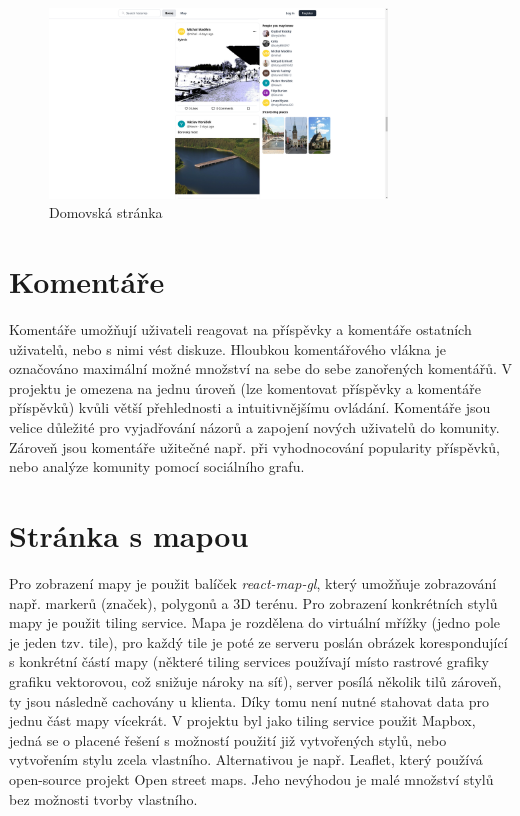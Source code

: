 \documentclass[12pt, a4paper,
 twoside,        %
 openright
]{report}
\begin{document}
\begin{figure}[h]
	\centering
	\includegraphics[width=0.8\textwidth]{images/home_page.png}
	\caption{Domovská stránka}\label{figure:homePagePreview}
\end{figure}

\section{Komentáře}
Komentáře umožňují uživateli reagovat na příspěvky a komentáře ostatních uživatelů, nebo s nimi vést diskuze. Hloubkou komentářového vlákna je označováno maximální možné množství na sebe do sebe zanořených komentářů. V projektu je omezena na jednu úroveň (lze komentovat příspěvky a komentáře příspěvků) kvůli větší přehlednosti a intuitivnějšímu ovládání. Komentáře jsou velice důležité pro vyjadřování názorů a zapojení nových uživatelů do komunity. Zároveň jsou komentáře užitečné např. při vyhodnocování popularity příspěvků, nebo analýze komunity pomocí sociálního grafu.
\cite{whyAreCommentsImportant}

\section{Stránka s mapou}
Pro zobrazení mapy je použit balíček \textit{react-map-gl}, který umožňuje zobrazování např. markerů (značek), polygonů a 3D terénu. Pro zobrazení konkrétních stylů mapy je použit tiling service. Mapa je rozdělena do virtuální mřížky (jedno pole je jeden tzv. tile), pro každý tile je poté ze serveru poslán obrázek korespondující s konkrétní částí mapy (některé tiling services používají místo rastrové grafiky grafiku vektorovou, což snižuje nároky na síť), server posílá několik tilů zároveň, ty jsou následně cachovány u klienta. Díky tomu není nutné stahovat data pro jednu část mapy vícekrát. V projektu byl jako tiling service použit Mapbox, jedná se o placené řešení s možností použití již vytvořených stylů, nebo vytvořením stylu zcela vlastního. Alternativou je např. Leaflet, který používá open-source projekt Open street maps. Jeho nevýhodou je malé množství stylů bez možnosti tvorby vlastního.
\end{document}
